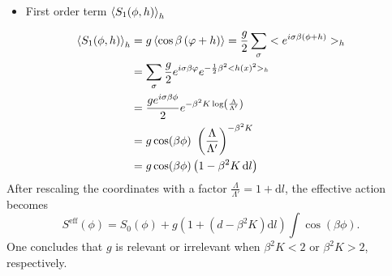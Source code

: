 \documentclass[submission, PhysLectNotes]{SciPost}
\begin{document}
\begin{itemize}
	\item First order term $\expval{S_1(\phi ,h)}_h$
\end{itemize}
\begin{equation}
	\begin{aligned}
		\expval{S_1(\phi ,h)}_h &= g \expval{\cos \beta \left(\varphi+h\right)} = \frac{g}{2}\sum _{\sigma }< e^{i \sigma  \beta  ( \phi  +h)}>_{h }\\
		& = \sum_\sigma \frac{g}{2}e^{i \sigma
		\beta  \varphi }e^{-\frac{1}{2}\beta ^2 <h(x)^2>_h } \\
 		&= \frac{g e^{i \sigma  \beta  \phi }}{2}e^{-\beta ^2 K\log 
			\left(\frac{\Lambda }{\Lambda '}\right) } \\
		&=g \cos  (\beta  \phi )\text{  }\left(\frac{\Lambda }{\Lambda '}\right)^{-\beta ^2K} \\
		&= g \cos(\beta  \phi )\left( 1 - \beta ^2K\,\mathrm{d}l \right)
	\end{aligned}
\end{equation}
After rescaling the coordinates with a factor $\frac{\Lambda}{\Lambda'}=1+\mathrm{d}l$, the effective action becomes
\begin{equation}
S^{\text{eff}}( \phi  ) = S_0(\phi ) +g \left(1 + \left(d-\beta^2K \right)\mathrm{d}l\right) \int \cos  (\beta  \phi ) .
\end{equation}
One concludes that \(g\) is relevant or irrelevant when \(\beta^2K<2\) or \(\beta ^2K>2\), respectively.
\end{document}
